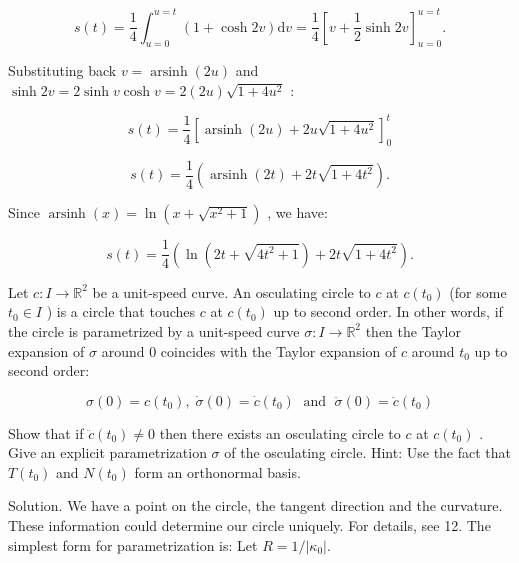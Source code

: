 \documentclass[10pt]{article}
\begin{document}
\[
s\left( t\right)  = \frac{1}{4}{\int }_{u = 0}^{u = t}\left( {1 + \cosh {2v}}\right) \mathrm{d}v = \frac{1}{4}{\left\lbrack  v + \frac{1}{2}\sinh 2v\right\rbrack  }_{u = 0}^{u = t}.
\]

Substituting back \(v = \operatorname{arsinh}\left( {2u}\right)\) and \(\sinh {2v} = 2\sinh v\cosh v = 2\left( {2u}\right) \sqrt{1 + 4{u}^{2}}\) :

\[
s\left( t\right)  = \frac{1}{4}{\left\lbrack  \operatorname{arsinh}\left( 2u\right)  + 2u\sqrt{1 + 4{u}^{2}}\right\rbrack  }_{0}^{t}
\]

\[
s\left( t\right)  = \frac{1}{4}\left( {\operatorname{arsinh}\left( {2t}\right)  + {2t}\sqrt{1 + 4{t}^{2}}}\right) .
\]

Since \(\operatorname{arsinh}\left( x\right)  = \ln \left( {x + \sqrt{{x}^{2} + 1}}\right)\) , we have:

\[
s\left( t\right)  = \frac{1}{4}\left( {\ln \left( {{2t} + \sqrt{4{t}^{2} + 1}}\right)  + {2t}\sqrt{1 + 4{t}^{2}}}\right) .
\]

\begin{problem}[title=PROBLEM 5 (5 POINTS)]
Let \(c : I \rightarrow  {\mathbb{R}}^{2}\) be a unit-speed curve. An osculating circle to \(c\) at \(c\left( {t}_{0}\right)\) (for some \({t}_{0} \in  I\) ) is a circle that touches \(c\) at \(c\left( {t}_{0}\right)\) up to second order. In other words, if the circle is parametrized by a unit-speed curve \(\sigma  : I \rightarrow  {\mathbb{R}}^{2}\) then the Taylor expansion of \(\sigma\) around 0 coincides with the Taylor expansion of \(c\) around \({t}_{0}\) up to second order:

\[
\sigma \left( 0\right)  = c\left( {t}_{0}\right) ,\;\dot{\sigma }\left( 0\right)  = \dot{c}\left( {t}_{0}\right) \;\text{ and }\;\ddot{\sigma }\left( 0\right)  = \ddot{c}\left( {t}_{0}\right)
\]

Show that if \(\ddot{c}\left( {t}_{0}\right)  \neq  0\) then there exists an osculating circle to \(c\) at \(c\left( {t}_{0}\right)\) . Give an explicit parametrization \(\sigma\) of the osculating circle. Hint: Use the fact that \(T\left( {t}_{0}\right)\) and \(N\left( {t}_{0}\right)\) form an orthonormal basis.
\end{problem}

Solution. We have a point on the circle, the tangent direction and the curvature. These information could determine our circle uniquely. For details, see 12. The simplest form for parametrization is: Let \(R = 1/\left| {\kappa }_{0}\right| .\)
\end{document}
